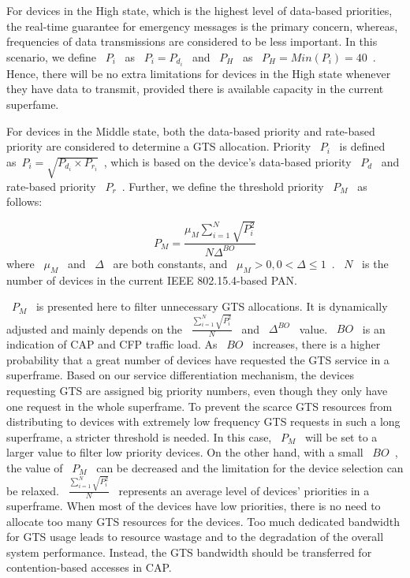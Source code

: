 \documentclass[letterpaper]{sig-alternate-10pt}
\begin{document}
For devices in the High state, which is the highest level of data-based priorities, the real-time guarantee for emergency messages is the primary concern, whereas, frequencies of data transmissions are considered to be less important. In this scenario, we define ~$P_i$~ as ~${P_i} = {P_{{d_i}}}$~ and ~$P_H$~ as ~${P_H} = Min({P_i}) = 40$~. Hence, there will be no extra limitations for devices in the High state whenever they have data to transmit, provided there is available capacity in the current superfame.

For devices in the Middle state, both the data-based priority and rate-based priority are considered to determine a GTS allocation. Priority ~$P_i$~ is defined as~${P_i} = \sqrt {{P_{{d_i}}} \times {P_{{r_i}}}} $~, which is based on the device's data-based priority ~$P_d$~  and rate-based priority ~$P_r$~. Further, we define the threshold priority ~$P_M$~ as follows:

\begin{equation}{P_M} = \frac{{{\mu _M}\sum\limits_{i = 1}^N {\sqrt {P_i^2} } }}{{N{\Delta ^{BO}}}}\end{equation}
where ~${\mu _M}$~ and ~$\Delta $~ are both constants, and ~${\mu _M} > 0, 0 < \Delta  \le 1$~. ~$N$~ is the number of devices in the current IEEE 802.15.4-based PAN.

~$P_M$~ is presented here to filter unnecessary GTS allocations. It is dynamically adjusted and mainly depends on the ~$\frac{{\sum\limits_{i = 1}^N {\sqrt {P_i^2} } }}{N}$~ and ~${\Delta ^{BO}}$~ value. ~$BO$~ is an indication of CAP and CFP traffic load. As ~$BO$~ increases, there is a higher probability that a great number of devices have requested the GTS service in a superframe. Based on our service differentiation mechanism, the devices requesting GTS are assigned big priority numbers, even though they only have one request in the whole superframe. To prevent the scarce GTS resources from distributing to devices with extremely low frequency GTS requests in such a long superframe, a stricter threshold is needed. In this case, ~$P_M$~ will be set to a larger value to filter low priority devices. On the other hand, with a small ~$BO$~, the value of ~$P_M$~ can be decreased and the limitation for the device selection can be relaxed. ~$\frac{{\sum\limits_{i = 1}^N {\sqrt {P_i^2} } }}{N}$~ represents an average level of devices' priorities in a superframe. When most of the devices have low priorities, there is no need to allocate too many GTS resources for the devices. Too much dedicated bandwidth for GTS usage leads to resource wastage and to the degradation of the overall system performance. Instead, the GTS bandwidth should be transferred for contention-based accesses in CAP.
\end{document}
